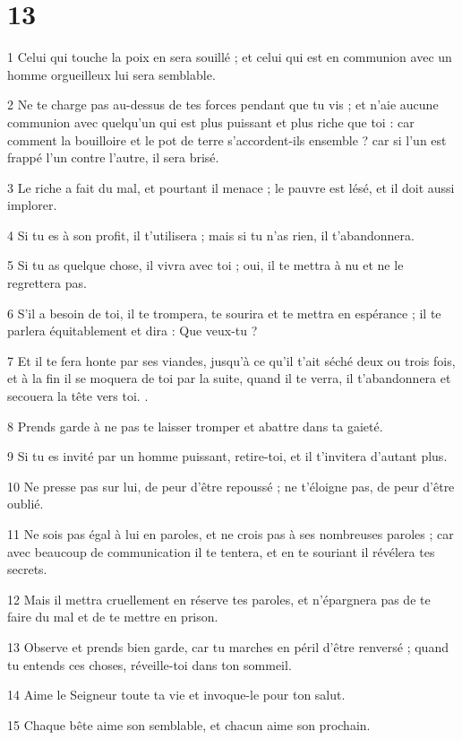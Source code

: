 \chapter{13}

\par 1 Celui qui touche la poix en sera souillé ; et celui qui est en communion avec un homme orgueilleux lui sera semblable.
\par 2 Ne te charge pas au-dessus de tes forces pendant que tu vis ; et n'aie aucune communion avec quelqu'un qui est plus puissant et plus riche que toi : car comment la bouilloire et le pot de terre s'accordent-ils ensemble ? car si l'un est frappé l'un contre l'autre, il sera brisé.
\par 3 Le riche a fait du mal, et pourtant il menace ; le pauvre est lésé, et il doit aussi implorer.
\par 4 Si tu es à son profit, il t'utilisera ; mais si tu n'as rien, il t'abandonnera.
\par 5 Si tu as quelque chose, il vivra avec toi ; oui, il te mettra à nu et ne le regrettera pas.
\par 6 S'il a besoin de toi, il te trompera, te sourira et te mettra en espérance ; il te parlera équitablement et dira : Que veux-tu ?
\par 7 Et il te fera honte par ses viandes, jusqu'à ce qu'il t'ait séché deux ou trois fois, et à la fin il se moquera de toi par la suite, quand il te verra, il t'abandonnera et secouera la tête vers toi. .
\par 8 Prends garde à ne pas te laisser tromper et abattre dans ta gaieté.
\par 9 Si tu es invité par un homme puissant, retire-toi, et il t'invitera d'autant plus.
\par 10 Ne presse pas sur lui, de peur d'être repoussé ; ne t'éloigne pas, de peur d'être oublié.
\par 11 Ne sois pas égal à lui en paroles, et ne crois pas à ses nombreuses paroles ; car avec beaucoup de communication il te tentera, et en te souriant il révélera tes secrets.
\par 12 Mais il mettra cruellement en réserve tes paroles, et n'épargnera pas de te faire du mal et de te mettre en prison.
\par 13 Observe et prends bien garde, car tu marches en péril d'être renversé ; quand tu entends ces choses, réveille-toi dans ton sommeil.
\par 14 Aime le Seigneur toute ta vie et invoque-le pour ton salut.
\par 15 Chaque bête aime son semblable, et chacun aime son prochain.
